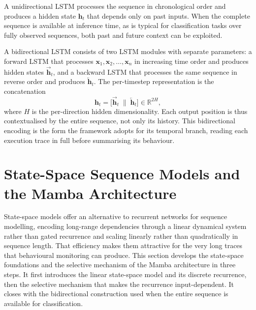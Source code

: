 \documentclass[%
    BCOR=10mm,
    DIV=13,
    toc=bibliography,
    toc=listof,
    oneside,
    12pt,
]{scrbook}
\begin{document}
A unidirectional LSTM processes the sequence in chronological order and
produces a hidden state $\mathbf{h}_t$ that depends only on past inputs. When
the complete sequence is available at inference time, as is typical for
classification tasks over fully observed sequences, both past and future
context can be exploited.

A bidirectional LSTM consists of two LSTM modules with separate parameters: a
forward LSTM that processes $\mathbf{x}_1, \mathbf{x}_2, \ldots, \mathbf{x}_n$
in increasing time order and produces hidden states
$\overrightarrow{\mathbf{h}}_t$, and a backward LSTM that processes the same
sequence in reverse order and produces $\overleftarrow{\mathbf{h}}_t$. The
per-timestep representation is the concatenation
\begin{equation}
  \mathbf{h}_t = \bigl[ \overrightarrow{\mathbf{h}}_t \;\|\; \overleftarrow{\mathbf{h}}_t \bigr]
  \in \mathbb{R}^{2H},
  \label{eq:bilstm}
\end{equation}
where $H$ is the per-direction hidden dimensionality. Each output position is
thus contextualised by the entire sequence, not only its history. This
bidirectional encoding is the form the framework adopts for its temporal branch,
reading each execution trace in full before summarising its behaviour.

\iffalse
\section{State-Space Sequence Models and the Mamba Architecture}
\label{sec:mamba}

State-space models offer an alternative to recurrent networks for sequence
modelling, encoding long-range dependencies through a linear dynamical system
rather than gated recurrence and scaling linearly rather than quadratically in
sequence length. That efficiency makes them attractive for the very long traces
that behavioural monitoring can produce. This section develops the state-space
foundations and the selective mechanism of the Mamba architecture in three steps.
It first introduces the linear state-space model and its discrete recurrence,
then the selective mechanism that makes the recurrence input-dependent. It closes
with the bidirectional construction used when the entire sequence is available
for classification.
\end{document}
